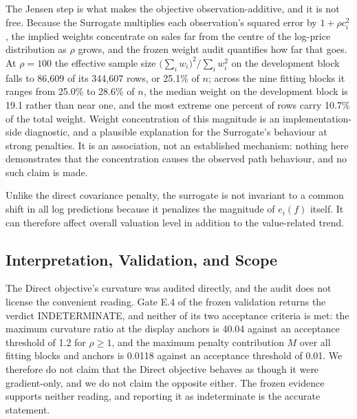 \documentclass[10pt]{article}
\theoremstyle{definition}
\newcommand{\1}{\mathbf{1}}
\begin{document}
The Jensen step is what makes the objective observation-additive, and it is not
free. Because the Surrogate multiplies each observation's squared error by
$1+\rho c_i^{2}$, the implied weights concentrate on sales far from the centre of the
log-price distribution as $\rho$ grows, and the frozen weight audit quantifies how far
that goes. At $\rho=100$ the effective sample size
$\bigl(\sum_i w_i\bigr)^{2}/\sum_i w_i^{2}$ on the development block falls to 86,609 of
its 344,607 rows, or 25.1\% of $n$; across the nine fitting blocks it ranges from 25.0\%
to 28.6\% of $n$, the median weight on the development block is 19.1 rather than near
one, and the most extreme one percent of rows carry 10.7\% of the total weight. Weight
concentration of this magnitude is an implementation-side diagnostic, and a plausible
explanation for the Surrogate's behaviour at strong penalties. It is an association, not
an established mechanism: nothing here demonstrates that the concentration causes the
observed path behaviour, and no such claim is made.


{Unlike the direct covariance penalty, the surrogate is not invariant to a common shift in all log predictions because it penalizes the magnitude of $e_i(f)$ itself. It can therefore affect
overall valuation level in addition to the value-related trend.
}


\subsection{{Interpretation, Validation, and Scope}}
\label{subsec:correction_scope}


The Direct objective's curvature was audited directly, and the audit does not
license the convenient reading. Gate E.4 of the frozen validation returns the verdict
INDETERMINATE, and neither of its two acceptance criteria is met: the maximum curvature
ratio at the display anchors is 40.04 against an acceptance threshold of 1.2 for
$\rho\ge1$, and the maximum penalty contribution $M$ over all fitting blocks and anchors
is 0.0118 against an acceptance threshold of 0.01. We therefore do not claim that the
Direct objective behaves as though it were gradient-only, and we do not claim the
opposite either. The frozen evidence supports neither reading, and reporting it as
indeterminate is the accurate statement.
\end{document}
